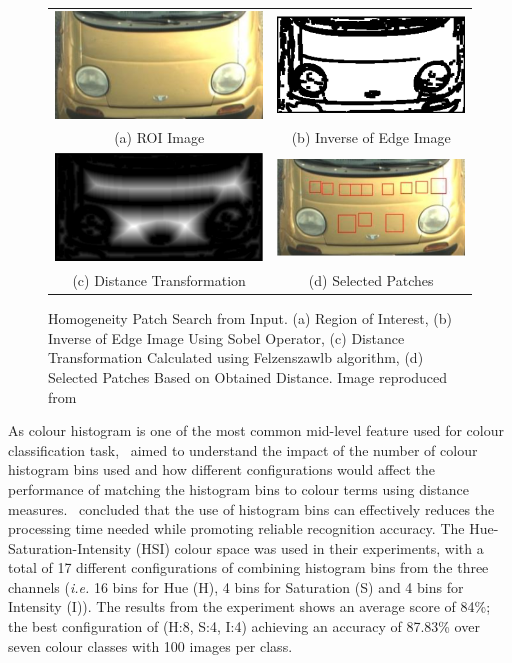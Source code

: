 \begin{figure}[!htb]
 \centering
 \begin{tabular}{cc}
  \includegraphics[width=0.3\linewidth]{image/lit/homo1.png}
 & \includegraphics[width=0.3\linewidth]{image/lit/homo3.png} \\
  (a) ROI Image
 & (b) Inverse of Edge Image \\
  \includegraphics[width=0.3\linewidth]{image/lit/homo2.png} &
  \includegraphics[width=0.3\linewidth]{image/lit/homo4.png} \\
  (c) Distance Transformation &
  (d) Selected Patches\\
 \end{tabular}
 \caption[Homogeneity Patch Search from Input. (a) Region of Interest, (b)
Inverse of Edge Image Using Sobel Operators, (c) Distance Transformation
Calculated using Felzen-szwlb algorithm, (d) Selected Patches Based on Obtained
Distance.]{Homogeneity Patch Search from Input. (a) Region of Interest, (b)
Inverse of Edge Image Using Sobel Operator, (c) Distance Transformation
Calculated using Felzenszawlb algorithm, (d) Selected Patches Based on Obtained
Distance. Image reproduced from~
 \label{fig:colorpatches}}
\end{figure}

As colour histogram is one of the most common mid-level feature used for colour
classification task,~ aimed to understand the impact of the number of colour histogram bins used and how different configurations
would affect the performance of matching the histogram bins to colour terms
using distance measures.~ concluded that the use of histogram bins can effectively reduces the processing time needed while promoting reliable recognition accuracy. The Hue-Saturation-Intensity (HSI) colour space was used in their experiments, with a total of 17 different configurations of combining histogram bins from the three channels (\emph{i.e.} 16 bins for Hue (H), 4 bins for Saturation (S) and 4 bins for Intensity (I)). The results from the experiment shows an average score of 84\%; the best
configuration of (H:8, S:4, I:4) achieving an accuracy of 87.83\% over seven colour classes with 100 images per class.

